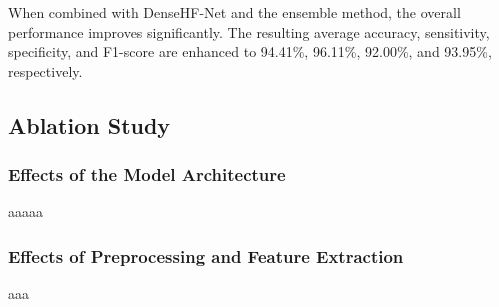 When combined with DenseHF-Net and the ensemble method, the overall performance improves significantly. The resulting average accuracy, sensitivity, specificity, and F1-score are enhanced to 94.41\%, 96.11\%, 92.00\%, and 93.95\%, respectively.
\subsection{Ablation Study}
\subsubsection{Effects of the Model Architecture}
aaaaa
\subsubsection{Effects of Preprocessing and Feature Extraction}
aaa